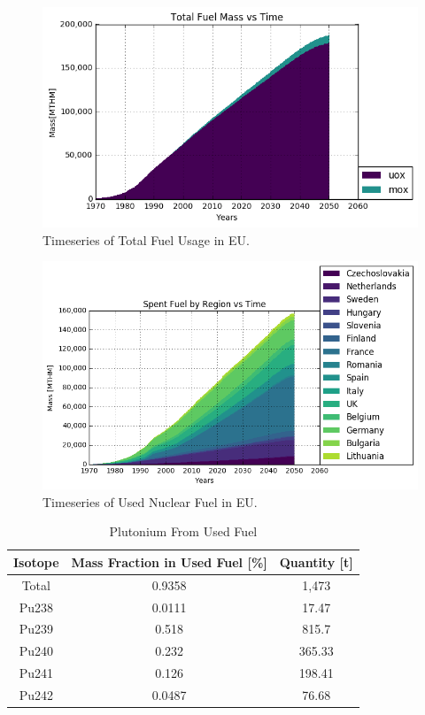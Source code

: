 \begin{figure}[htbp!]
	\begin{center}
		\includegraphics[scale=0.7]{./images/eu_future/total_fuel.png}
	\end{center}
	\caption{Timeseries of Total Fuel Usage in \gls{EU}.}
	\label{fig:eu_fuel}
\end{figure}


\begin{figure}[htbp!]
	\begin{center}
			\includegraphics[scale=0.7]{./images/eu_future/snf.png}
	\end{center}
	\caption{Timeseries of Used Nuclear Fuel in \gls{EU}.}
	\label{fig:eu_snf}
\end{figure}
\FloatBarrier


\begin{table}[h]
	\centering
	\begin{tabular}{|c|c|c|}
		\hline
		Isotope & Mass Fraction in Used Fuel [\%] & Quantity [t] \\ \hline
		Total & 0.9358 & 1,473 \\ \hline
		Pu238 & 0.0111 & 17.47 \\ \hline
		Pu239 & 0.518 & 815.7 \\ \hline
		Pu240 & 0.232 & 365.33 \\ \hline
		Pu241 & 0.126 & 198.41 \\ \hline
		Pu242 & 0.0487 & 76.68 \\ \hline
	\end{tabular}
	\caption{Plutonium From Used Fuel}
	\label{tab:pu}
\end{table}


